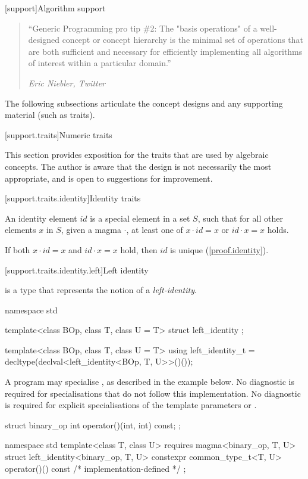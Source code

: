 [support]{Algorithm support}

\begin{quote}
``Generic Programming pro tip \#2: The "basis operations" of a well-designed concept or concept
hierarchy is the minimal set of operations that are both sufficient and necessary for efficiently
implementing all algorithms of interest within a particular domain.''
\begin{flushright}
\textemdash \textit{Eric Niebler, Twitter}
\end{flushright}
\end{quote}

The following subsections articulate the concept designs and any supporting material (such as
traits).


[support.traits]{Numeric traits}

This section provides exposition for the traits that are used by algebraic concepts. The author is
aware that the design is not necessarily the most appropriate, and is open to suggestions for
improvement.

[support.traits.identity]{Identity traits}

\pnum
An identity element $id$ is a special element in a set $S$, such that for all other elements $x$ in
$S$, given a magma $\cdot$, at least one of $x \cdot id = x$ or $id \cdot x = x$ holds.

\pnum
If both $x \cdot id = x$ and $id \cdot x = x$ hold, then $id$ is unique (\ref{proof.identity}).

[support.traits.identity.left]{Left identity}

\pnum
{} is a type that represents the notion of a \textit{left-identity}.

\begin{itemdecl}
namespace std {
  template<class BOp, class T, class U = T>
  struct left_identity {};

  template<class BOp, class T, class U = T>
  using left_identity_t = decltype(declval<left_identity<BOp, T, U>>()());
}
\end{itemdecl}
\begin{itemdescr}
   \pnum
   A program may specialise , as described in the example below. No diagnostic is
   required for specialisations that do not follow this implementation. No diagnostic is required for
   explicit specialisations of the template parameters  or .
\begin{example}
\begin{codeblock}
struct binary_op {
  int operator()(int, int) const;
};

namespace std {
  template<class T, class U>
  requires magma<binary_op, T, U>
  struct left_identity<binary_op, T, U> {
    constexpr common_type_t<T, U> operator()() const
    { /* implementation-defined */ }
  };
}
\end{codeblock}
\end{example}

\end{itemdescr}

